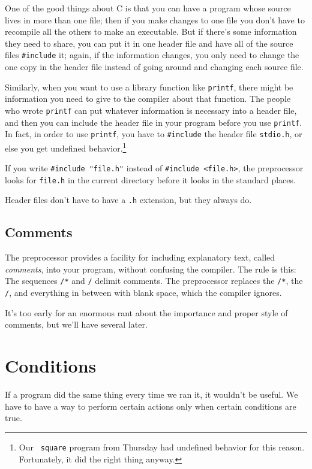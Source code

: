 One of the good things about C is that you can have a program whose
source lives in more than one file; then if you make changes to one file
you don't have to recompile all the others to make an executable.  But
if there's some information they need to share, you can put it in one
header file and have all of the source files {\tt \#include} it; again,
if the information changes, you only need to change the one copy in the
header file instead of going around and changing each source file.

Similarly, when you want to use a library function like {\tt printf},
there might be information you need to give to the compiler about that
function.  The people who wrote {\tt printf} can put whatever
information is necessary into a header file, and then you can include
the header file in your program before you use {\tt printf}.  In fact,
in order to use {\tt printf}, you have to {\tt\#include} the header file
{\tt stdio.h}, or else you get undefined behavior.\footnote{Our {\tt
square} program from Thursday had undefined behavior for this reason.
Fortunately, it did the right thing anyway.}

If you write {\tt\#include "file.h"} instead of {\tt\#include <file.h>},
the preprocessor looks for {\tt file.h} in the current directory before
it looks in the standard places.

Header files don't have to have a {\tt .h} extension, but they always
do.

\subsection{Comments}

The preprocessor provides a facility for including explanatory text,
called {\em comments}\/, into your program, without confusing the
compiler.  The rule is this: The sequences {\tt /*} and {\tt */} delimit
comments.  The preprocessor replaces the {\tt /*}, the {\tt */}, and
everything in between with blank space, which the compiler ignores.

It's too early for an enormous rant about the importance and proper
style of comments, but we'll have several later.

\section{Conditions}

If a program did the same thing every time we ran it, it wouldn't be
useful.  We have to have a way to perform certain actions only when
certain conditions are true.


